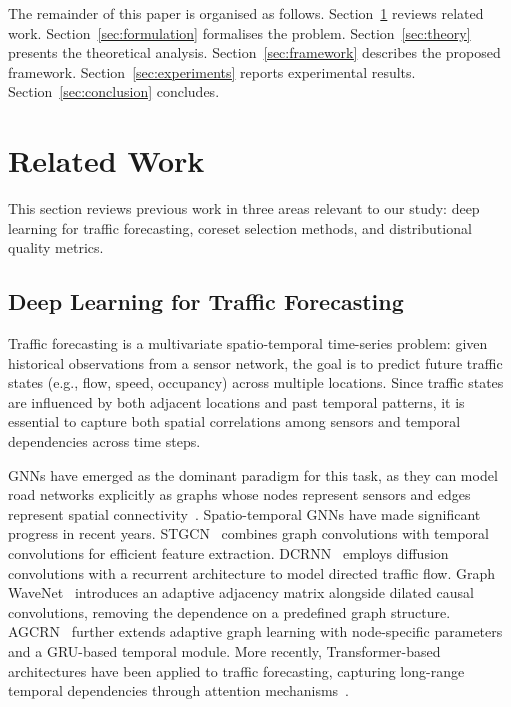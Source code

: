 \documentclass[journal]{IEEEtran}
\begin{document}
The remainder of this paper is organised as follows.
Section~\ref{sec:related} reviews related work.
Section~\ref{sec:formulation} formalises the problem.
Section~\ref{sec:theory} presents the theoretical analysis.
Section~\ref{sec:framework} describes the proposed framework.
Section~\ref{sec:experiments} reports experimental results.
Section~\ref{sec:conclusion} concludes.


\section{Related Work}
\label{sec:related}

This section reviews previous work in three areas relevant to our
study: deep learning for traffic forecasting, coreset selection
methods, and distributional quality metrics.

\subsection{Deep Learning for Traffic Forecasting}
\label{sec:related-traffic}

Traffic forecasting is a multivariate spatio-temporal time-series
problem: given historical observations from a sensor network, the
goal is to predict future traffic states (e.g., flow, speed,
occupancy) across multiple locations.
Since traffic states are influenced by both adjacent locations and
past temporal patterns, it is essential to capture both spatial
correlations among sensors and temporal dependencies across time
steps.

GNNs have emerged as the dominant paradigm for this task, as they
can model road networks explicitly as graphs whose nodes represent
sensors and edges represent spatial
connectivity~\cite{yin_deep_2021}.
Spatio-temporal GNNs have made significant progress in recent
years.
STGCN~\cite{yu_spatio-temporal_2018} combines graph convolutions
with temporal convolutions for efficient feature extraction.
DCRNN~\cite{li_diffusion_2018} employs diffusion convolutions with
a recurrent architecture to model directed traffic flow.
Graph WaveNet~\cite{wu_graph_2019} introduces an adaptive adjacency
matrix alongside dilated causal convolutions, removing the
dependence on a predefined graph structure.
AGCRN~\cite{bai_adaptive_2020} further extends adaptive graph
learning with node-specific parameters and a GRU-based temporal
module.
More recently, Transformer-based architectures have been applied
to traffic forecasting, capturing long-range temporal dependencies
through attention mechanisms~\cite{xu_spatial-temporal_2020,
shao_decoupled_2022, li_dynamic_2024, wang_adaptive_2024}.
\end{document}
